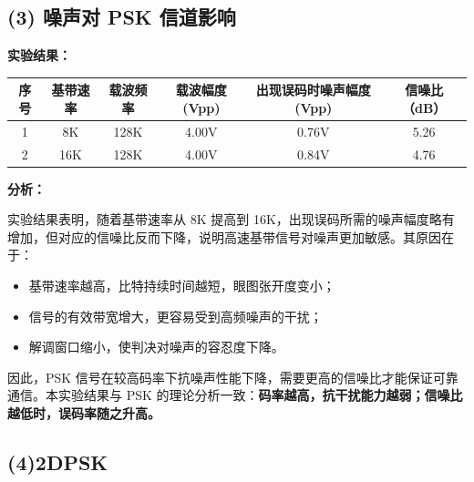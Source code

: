 \documentclass{xjtureport}
\begin{document}
\subsection*{(3) 噪声对 PSK 信道影响}

\textbf{实验结果：}

\begin{table}[H]
	\centering
	\begin{tabular}{|c|c|c|c|c|c|}
		\hline
		序号 & 基带速率 & 载波频率 & 载波幅度(Vpp) & 出现误码时噪声幅度(Vpp) & 信噪比（dB） \\
		\hline
		1 & 8K  & 128K & 4.00V & 0.76V & 5.26 \\
		\hline
		2 & 16K & 128K & 4.00V & 0.84V & 4.76 \\
		\hline
	\end{tabular}
\end{table}

\textbf{分析：}

实验结果表明，随着基带速率从 8K 提高到 16K，出现误码所需的噪声幅度略有增加，但对应的信噪比反而下降，说明高速基带信号对噪声更加敏感。其原因在于：

\begin{itemize}
	\item 基带速率越高，比特持续时间越短，眼图张开度变小；
	\item 信号的有效带宽增大，更容易受到高频噪声的干扰；
	\item 解调窗口缩小，使判决对噪声的容忍度下降。
\end{itemize}

因此，PSK 信号在较高码率下抗噪声性能下降，需要更高的信噪比才能保证可靠通信。本实验结果与 PSK 的理论分析一致：\textbf{码率越高，抗干扰能力越弱；信噪比越低时，误码率随之升高。}


%	
%	
%	
%		
%		
%	

\subsection*{(4)2DPSK}
\end{document}
